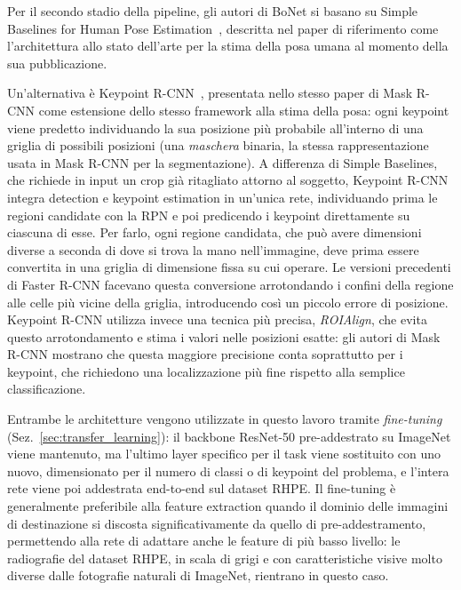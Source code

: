 Per il secondo stadio della pipeline, gli autori di BoNet si basano su
Simple Baselines for Human Pose Estimation~\cite{xiao2018simplebaselines},
descritta nel paper di riferimento come l'architettura allo stato
dell'arte per la stima della posa umana al momento della sua
pubblicazione.

Un'alternativa è Keypoint R-CNN~\cite{he2017maskrcnn}, presentata nello
stesso paper di Mask R-CNN come estensione dello stesso framework alla
stima della posa: ogni keypoint viene predetto individuando la sua
posizione più probabile all'interno di una griglia di possibili
posizioni (una \emph{maschera} binaria, la stessa rappresentazione
usata in Mask R-CNN per la segmentazione). A
differenza di Simple Baselines, che richiede in input un crop già
ritagliato attorno al soggetto, Keypoint R-CNN integra detection e
keypoint estimation in un'unica rete, individuando prima le regioni
candidate con la RPN e poi predicendo i keypoint direttamente su ciascuna
di esse. Per farlo, ogni regione candidata, che può avere dimensioni
diverse a seconda di dove si trova la mano nell'immagine, deve prima
essere convertita in una griglia di dimensione fissa su cui operare. Le
versioni precedenti di Faster R-CNN facevano questa conversione
arrotondando i confini della regione alle celle più vicine della
griglia, introducendo così un piccolo errore di posizione. Keypoint
R-CNN utilizza invece una tecnica più precisa, \emph{ROIAlign}, che
evita questo arrotondamento e stima i valori nelle posizioni esatte:
gli autori di Mask R-CNN mostrano che questa maggiore precisione conta
soprattutto per i keypoint, che richiedono una localizzazione più fine
rispetto alla semplice classificazione.

Entrambe le architetture vengono utilizzate in questo lavoro tramite
\emph{fine-tuning} (Sez.~\ref{sec:transfer_learning}): il backbone
ResNet-50 pre-addestrato su ImageNet viene mantenuto, ma l'ultimo layer
specifico per il task viene sostituito con uno nuovo, dimensionato per
il numero di classi o di keypoint del problema, e l'intera rete viene
poi addestrata end-to-end sul dataset RHPE. Il fine-tuning è
generalmente preferibile alla feature extraction quando il dominio delle
immagini di destinazione si discosta significativamente da quello di
pre-addestramento, permettendo alla rete di adattare anche le feature di
più basso livello: le radiografie del dataset RHPE, in scala di grigi e
con caratteristiche visive molto diverse dalle fotografie naturali di
ImageNet, rientrano in questo caso.

